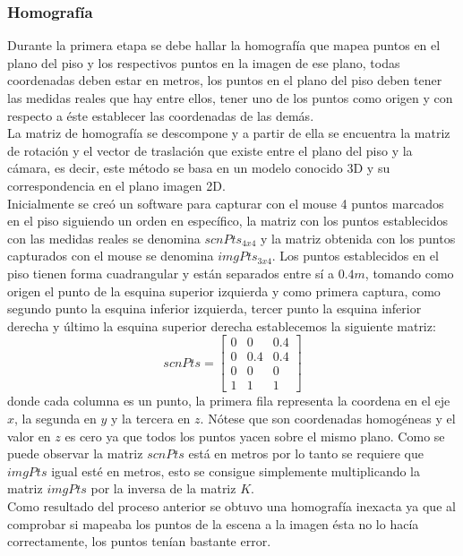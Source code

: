        \subsubsection{Homografía}
       Durante la primera etapa se debe hallar la homografía que mapea puntos en el plano del piso y los respectivos puntos en la imagen de ese plano, todas coordenadas deben estar en metros, los puntos en el plano del piso deben tener las medidas reales que hay entre ellos, tener uno de los puntos como origen y con respecto a éste establecer las coordenadas de las demás.\\
       La matriz de homografía se descompone y a partir de ella se encuentra la matriz de rotación y el vector de traslación que existe entre el plano del piso y la cámara, es decir, este método se basa en un modelo conocido 3D y su correspondencia en el plano imagen 2D.\\
       Inicialmente se creó un software para capturar con el mouse 4 puntos marcados en el piso siguiendo un orden en específico, la matriz con los puntos establecidos con las medidas reales se denomina $scnPts_{4x4}$ y la matriz obtenida con los puntos capturados con el mouse se denomina $imgPts_{3x4}$. Los puntos establecidos en el piso tienen forma cuadrangular y están separados entre sí a $0.4m$, tomando como origen el punto de la esquina superior izquierda y como primera captura, como segundo punto la esquina inferior izquierda, tercer punto la esquina inferior derecha y último la esquina superior derecha establecemos la siguiente matriz:
       \[scnPts=
       \begin{bmatrix}
       0 & 0 & 0.4\\
       0 & 0.4 & 0.4\\
       0 & 0 & 0\\
       1 & 1 & 1 
       \end{bmatrix}
       \]
       donde cada columna es un punto, la primera fila representa la coordena en el eje $x$, la segunda en $y$ y la tercera en $z$. Nótese que son coordenadas homogéneas y el valor en $z$ es cero ya que todos los puntos yacen sobre el mismo plano. Como se puede observar la matriz $scnPts$ está en metros por lo tanto se requiere que $imgPts$ igual esté en metros, esto se consigue simplemente multiplicando la matriz $imgPts$ por la inversa de la matriz $K$.\\
       Como resultado del proceso anterior se obtuvo una homografía inexacta ya que al comprobar si mapeaba los puntos de la escena a la imagen ésta no lo hacía correctamente, los puntos tenían bastante error.

